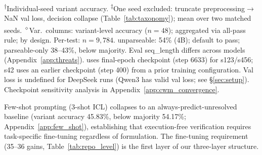\begin{table}[t]
\centering
\small
\caption{Repo-level cross-formulation comparison on SWE-bench Verified test set. Qwen3-8B \cls{}/\traj{}: mean $\pm$ std over 3 seeds; DeepSeek \cls{}: 2 seeds\textsuperscript{$\ddagger$}; DeepSeek \traj{}: 3 seeds; Qwen3-4B: seed 42. \cwm{}: 3 seeds (42/123/456).}
\label{tab:repo_level}

\vspace{2pt}
{\footnotesize \textsuperscript{$\dagger$}Individual-seed variant accuracy. \textsuperscript{$\ddagger$}One seed excluded: truncate preprocessing$\to$NaN val loss, decision collapse (Table~\ref{tab:taxonomy}); mean over two matched seeds. \textsuperscript{$\diamond$}Var.\ columns: variant-level accuracy ($n{=}48$); \cls{} aggregated via all-pass rule; \traj{} by design. Per-test: $n{=}9{,}784$. \cwm{} unparseable: 54\% (4B); default to pass; parseable-only 38--43\%, below majority. Eval seq\_length differs across models (Appendix~\ref{app:threats}). \cwm{} uses final-epoch checkpoint (step 6633) for s123/s456; s42 uses an earlier checkpoint (step 400) from a prior training configuration. Val loss is undefined for DeepSeek \cwm{} runs (Qwen3 \cwm{} has valid val loss; see \S\ref{sec:setup}). Checkpoint sensitivity analysis in Appendix~\ref{app:cwm_convergence}.}
\end{table}

Few-shot prompting (3-shot ICL) collapses to an always-predict-unresolved baseline (variant accuracy 45.83\%, below majority 54.17\%; Appendix~\ref{app:few_shot}), establishing that execution-free verification requires task-specific fine-tuning regardless of formulation. The fine-tuning requirement (35--36\pp{} gains, Table~\ref{tab:repo_level}) is the first layer of our three-layer structure.

